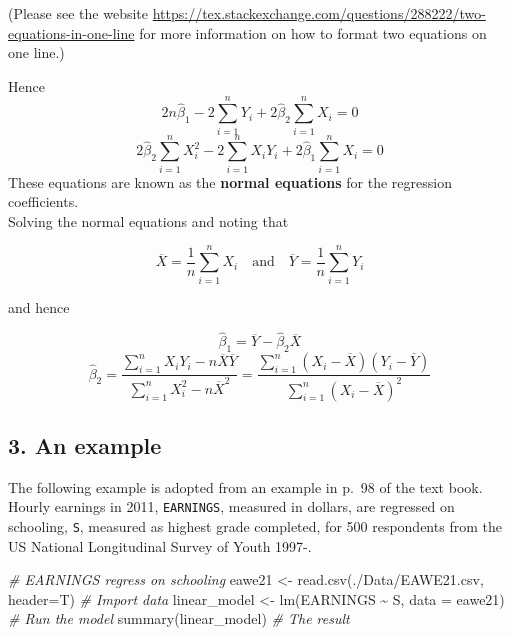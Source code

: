 \documentclass[
]{article}
\newenvironment{Shaded}{\begin{snugshade}}{\end{snugshade}}
\newcommand{\AttributeTok}[1]{\textcolor[rgb]{0.77,0.63,0.00}{#1}}
\newcommand{\CommentTok}[1]{\textcolor[rgb]{0.56,0.35,0.01}{\textit{#1}}}
\newcommand{\FunctionTok}[1]{\textcolor[rgb]{0.00,0.00,0.00}{#1}}
\newcommand{\NormalTok}[1]{#1}
\newcommand{\OtherTok}[1]{\textcolor[rgb]{0.56,0.35,0.01}{#1}}
\newcommand{\SpecialCharTok}[1]{\textcolor[rgb]{0.00,0.00,0.00}{#1}}
\newcommand{\StringTok}[1]{\textcolor[rgb]{0.31,0.60,0.02}{#1}}
\begin{document}
(Please see the website
\url{https://tex.stackexchange.com/questions/288222/two-equations-in-one-line}
for more information on how to format two equations on one line.)

Hence
\[2n\hat{\beta}_{1}-2\sum_{i=1}^{n}Y_i+2\hat{\beta}_{2}\sum_{i=1}^{n}X_i=0\]
\[2\hat{\beta}_{2}\sum_{i=1}^{n}X_i^2-2\sum_{i=1}^{n}X_iY_i+2\hat{\beta}_{1}\sum_{i=1}^{n}X_i=0\]
These equations are known as the \textbf{normal equations} for the
regression coefficients.\\
Solving the normal equations and noting that

\begin{equation}
\overline{X}=\frac{1}{n}\sum_{i=1}^{n}X_i
\quad\mathrm{and}\quad
\overline{Y}=\frac{1}{n}\sum_{i=1}^{n}Y_i
\end{equation}

and hence

\[\hat{\beta}_{1}=\overline{Y}-\hat{\beta}_{2}\overline{X}\]
\[\hat{\beta}_{2}=\frac{\sum_{i=1}^{n}X_iY_i-n\overline{X}\overline{Y}}{\sum_{i=1}^{n}X_i^2-n\overline{X}^2}=\frac{\sum_{i=1}^{n}(X_i-\overline{X})(Y_i-\overline{Y})}{\sum_{i=1}^{n}(X_i-\overline{X})^2}\]

\hypertarget{an-example}{%
\subsection{3. An example}\label{an-example}}

The following example is adopted from an example in p.~98 of the text
book. Hourly earnings in 2011, \texttt{EARNINGS}, measured in dollars,
are regressed on schooling, \texttt{S}, measured as highest grade
completed, for 500 respondents from the US National Longitudinal Survey
of Youth 1997-.

\begin{Shaded}
\begin{Highlighting}[]
\CommentTok{\# EARNINGS regress on schooling}
\NormalTok{eawe21 }\OtherTok{\textless{}{-}} \FunctionTok{read.csv}\NormalTok{(}\StringTok{\textquotesingle{}./Data/EAWE21.csv\textquotesingle{}}\NormalTok{, }\AttributeTok{header=}\NormalTok{T)   }\CommentTok{\# Import data}
\NormalTok{linear\_model }\OtherTok{\textless{}{-}} \FunctionTok{lm}\NormalTok{(EARNINGS }\SpecialCharTok{\textasciitilde{}}\NormalTok{ S, }\AttributeTok{data =}\NormalTok{ eawe21)     }\CommentTok{\# Run the model}
\FunctionTok{summary}\NormalTok{(linear\_model)                               }\CommentTok{\# The result}
\end{Highlighting}
\end{Shaded}
\end{document}

